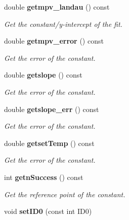 \begin{DoxyCompactItemize}
\item 
double {\bf getmpv\_\-landau} () const \label{classCALICE_1_1ScECALMIPfit_a4ffa4a583185a6fb9616ce1a23be8040}

\begin{DoxyCompactList}\small\item\em Get the constant/y-\/intercept of the fit. \item\end{DoxyCompactList}\item 
double {\bf getmpv\_\-error} () const \label{classCALICE_1_1ScECALMIPfit_a849b6783d79e988cdf5f46b3502aedb2}

\begin{DoxyCompactList}\small\item\em Get the error of the constant. \item\end{DoxyCompactList}\item 
double {\bf getslope} () const \label{classCALICE_1_1ScECALMIPfit_a3cc2ee6c39ecb05eff8b42d677326e3a}

\begin{DoxyCompactList}\small\item\em Get the error of the constant. \item\end{DoxyCompactList}\item 
double {\bf getslope\_\-err} () const \label{classCALICE_1_1ScECALMIPfit_ae7dd36b75577b625bdc5e9ff4a190559}

\begin{DoxyCompactList}\small\item\em Get the error of the constant. \item\end{DoxyCompactList}\item 
double {\bf getsetTemp} () const \label{classCALICE_1_1ScECALMIPfit_afb9be9a27dc0bb69da904dc1cf595cf4}

\begin{DoxyCompactList}\small\item\em Get the error of the constant. \item\end{DoxyCompactList}\item 
int {\bf getnSuccess} () const \label{classCALICE_1_1ScECALMIPfit_a2bf9a88ad2a672f5072f05e3d04cd75c}

\begin{DoxyCompactList}\small\item\em Get the reference point of the constant. \item\end{DoxyCompactList}\item 
void {\bf setID0} (const int ID0)\label{classCALICE_1_1ScECALMIPfit_a6a1520a84d1f9ef8757ba0b2e9a919f2}


\end{DoxyCompactItemize}
